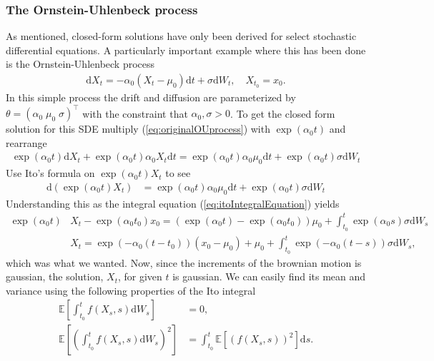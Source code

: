 \subsubsection{The Ornstein-Uhlenbeck process}
As mentioned, closed-form solutions have only been derived for select stochastic differential equations. A particularly important example where this has been done is the Ornstein-Uhlenbeck process
\begin{align}
    \mathrm{d}X_t = -\alpha_0\left(X_t - \mu_0\right)\mathrm{d}t + \sigma \mathrm{d}W_t, \quad X_{t_0} = x_0. \label{eq:originalOUprocess}
\end{align}
In this simple process the drift and diffusion are parameterized by $\theta = \left(\alpha_0\; \mu_0\; \sigma\right)^\top$ with the constraint that $\alpha_0, \sigma>0$.
To get the closed form solution for this SDE multiply (\ref{eq:originalOUprocess}) with $\exp\left(\alpha_0 t\right)$ and rearrange
\begin{align}
    \exp\left(\alpha_0 t\right)\mathrm{d}X_t + \exp\left(\alpha_0 t\right) \alpha_0 X_t \mathrm{d}t = \exp\left(\alpha_0 t\right)\alpha_0\mu_0 \mathrm{d}t + \exp\left(\alpha_0 t\right)\sigma \mathrm{d}W_t
\end{align}
Use Ito's formula on $\exp\left(\alpha_0 t\right)X_t$ to see
\begin{align}
    \mathrm{d}\left(\exp\left(\alpha_0 t\right)X_t\right) &= \exp\left(\alpha_0 t\right)\alpha_0 \mu_0 \mathrm{d}t + \exp\left(\alpha_0 t\right) \sigma \mathrm{d}W_t 
\end{align}
Understanding this as the integral equation (\ref{eq:itoIntegralEquation}) yields
\begin{align}
    \exp\left(\alpha_0 t\right)&X_t - \exp\left(\alpha_0 t_0\right)x_0 = \left(\exp\left(\alpha_0 t\right) - \exp\left(\alpha_0 t_0\right)\right)\mu_0 + \int_{t_0}^t \exp\left(\alpha_0 s\right)\sigma \mathrm{d}W_s \nonumber \\
    &X_t = \exp\left(-\alpha_0\left(t - t_0\right)\right)\left(x_0 - \mu_0\right) + \mu_0 + \int_{t_0}^t \exp\left(-\alpha_0 \left(t - s\right)\right)\sigma \mathrm{d}W_s \label{eq:OU_solution},
\end{align}
which was what we wanted. Now, since the increments of the brownian motion is gaussian, the solution, $X_t$, for given $t$ is gaussian. We can easily find its mean and variance using the following properties of the Ito integral \cite[theorem 3.2.1 and lemma 3.1.5]{Oksendal2003_yu}
\begin{align}
    \mathbb{E}\left[\int_{t_0}^t f(X_s, s) \mathrm{d}W_s\right] &= 0 \label{eq:meanOfItoIntegral},\\
    \mathbb{E}\left[\left(\int_{t_0}^t f(X_s, s) \mathrm{d}W_s\right)^2\right] &= \int_{t_0}^t \mathbb{E}\left[\left(f(X_s, s)\right)^2\right] \mathrm{d}s. \label{eq:ItoIsometry}
\end{align}
